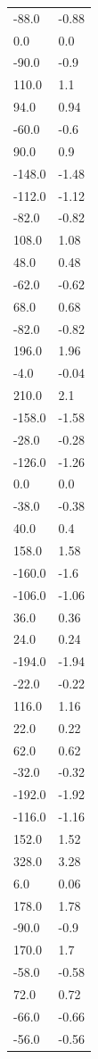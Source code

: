 \begin{longtable}{ll}
-88.0 & -0.88 \\
0.0 & 0.0 \\
-90.0 & -0.9 \\
110.0 & 1.1 \\
94.0 & 0.94 \\
-60.0 & -0.6 \\
90.0 & 0.9 \\
-148.0 & -1.48 \\
-112.0 & -1.12 \\
-82.0 & -0.82 \\
108.0 & 1.08 \\
48.0 & 0.48 \\
-62.0 & -0.62 \\
68.0 & 0.68 \\
-82.0 & -0.82 \\
196.0 & 1.96 \\
-4.0 & -0.04 \\
210.0 & 2.1 \\
-158.0 & -1.58 \\
-28.0 & -0.28 \\
-126.0 & -1.26 \\
0.0 & 0.0 \\
-38.0 & -0.38 \\
40.0 & 0.4 \\
158.0 & 1.58 \\
-160.0 & -1.6 \\
-106.0 & -1.06 \\
36.0 & 0.36 \\
24.0 & 0.24 \\
-194.0 & -1.94 \\
-22.0 & -0.22 \\
116.0 & 1.16 \\
22.0 & 0.22 \\
62.0 & 0.62 \\
-32.0 & -0.32 \\
-192.0 & -1.92 \\
-116.0 & -1.16 \\
152.0 & 1.52 \\
328.0 & 3.28 \\
6.0 & 0.06 \\
178.0 & 1.78 \\
-90.0 & -0.9 \\
170.0 & 1.7 \\
-58.0 & -0.58 \\
72.0 & 0.72 \\
-66.0 & -0.66 \\
-56.0 & -0.56 \\

\end{longtable}
